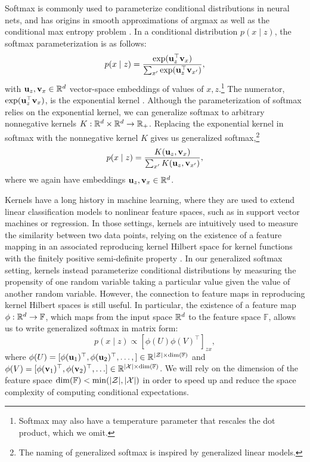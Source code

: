 \documentclass{article}
\begin{document}
Softmax is commonly used to parameterize conditional distributions in
neural nets, and has origins in smooth
approximations of argmax as well as the conditional max entropy problem \citep{}.
In a conditional distribution $p(x \mid z)$, the softmax parameterization is as follows: 
$$p(x \mid z) = \frac{\exp(\mathbf{u}_z^\top \mathbf{v}_x)}{\sum_{x'} \exp(\mathbf{u}_z^\top \mathbf{v}_{x'})},$$
with $\mathbf{u}_z,\mathbf{v}_x\in\mathbb{R}^d$ vector-space embeddings of values of $x,z$.\footnote{
Softmax may also have a temperature parameter that rescales 
the dot product, which we omit.
}
The numerator, $\exp(\mathbf{u}_z^\top \mathbf{v}_x)$, is the exponential kernel \citep{rawat2019sampledsoftmax}.
Although the parameterization of softmax relies on the exponential kernel,
we can generalize softmax to arbitrary nonnegative kernels $K: \mathbb{R}^d\times\mathbb{R}^d\to\mathbb{R}_+$.
Replacing the exponential kernel in softmax with the nonnegative kernel $K$
gives us generalized softmax,\footnote{
The naming of generalized softmax is inspired by generalized linear models.
}
$$p(x \mid z) = \frac{K(\mathbf{u}_z, \mathbf{v}_x)}{\sum_{x'} K(\mathbf{u}_z, \mathbf{v}_{x'})},$$
where we again have embeddings $\mathbf{u}_z,\mathbf{v}_x\in\mathbb{R}^d$.

Kernels have a long history in machine learning,
where they are used to extend linear classification models to nonlinear feature spaces,
such as in support vector machines or regression.
In those settings, kernels are intuitively used to measure the similarity between two data points,
relying on the existence of a feature mapping in an associated reproducing kernel Hilbert space 
for kernel functions with the finitely positive semi-definite property \citep{}.
In our generalized softmax setting, kernels instead parameterize conditional distributions by
measuring the propensity of one random variable taking a particular value given
the value of another random variable.
However, the connection to feature maps in reproducing kernel Hilbert spaces 
is still useful.
In particular, the existence of a feature map $\phi:\mathbb{R}^d\to\mathbb{F}$,
which maps from the input space $\mathbb{R}^d$ to the feature space $\mathbb{F}$,
allows us to write generalized softmax in matrix form:
$$p(x \mid z) \propto [\phi(U)\phi(V)^\top]_{zx},$$
where $\phi(U) = [\phi(\mathbf{u}_1)^\top, \phi(\mathbf{u}_2)^\top, \ldots,] \in\mathbb{R}^{|\mathcal{Z}|\times \dim(\mathbb{F})}$
and $\phi(V) = [\phi(\mathbf{v}_1)^\top, \phi(\mathbf{v}_2)^\top, \ldots]\in\mathbb{R}^{|\mathcal{X}|\times \dim(\mathbb{F})}$.
We will rely on the dimension of the feature space $\dim(\mathbb{F}) < \min(|\mathcal{Z}|,|\mathcal{X}|)$
in order to speed up and reduce the space complexity of computing conditional expectations.
\end{document}
